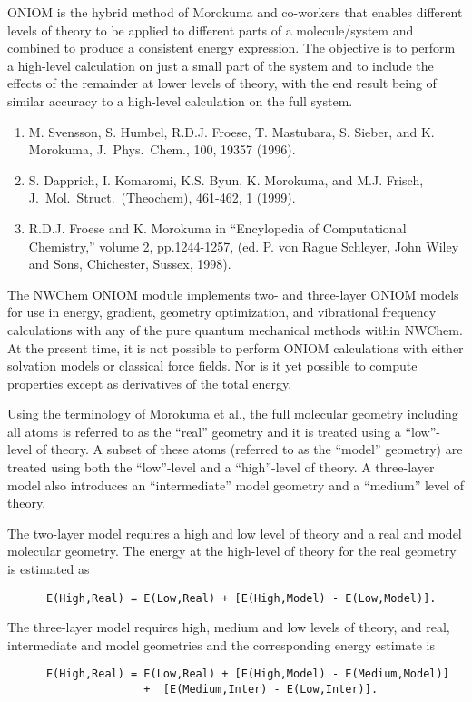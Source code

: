 %
%
\label{sec:oniom}

ONIOM is the hybrid method of Morokuma and co-workers that enables
different levels of theory to be applied to different parts of a
molecule/system and combined to produce a consistent energy
expression.  The objective is to perform a high-level calculation on
just a small part of the system and to include the effects of the
remainder at lower levels of theory, with the end result being of
similar accuracy to a high-level calculation on the full system.

\begin{enumerate}
\item M. Svensson, S. Humbel, R.D.J. Froese, T. Mastubara, S. Sieber, and
K. Morokuma, J.~Phys.~Chem., 100, 19357 (1996).
\item  S. Dapprich, I. Komaromi, K.S. Byun, K. Morokuma, and M.J. Frisch,
J.~Mol.~Struct.~(Theochem), 461-462, 1 (1999).
\item R.D.J. Froese and K. Morokuma in ``Encylopedia of Computational Chemistry,'' 
volume 2, pp.1244-1257, (ed. P. von Rague Schleyer, John Wiley and Sons, 
Chichester, Sussex, 1998).
\end{enumerate}

The NWChem ONIOM module implements two- and three-layer ONIOM models
for use in energy, gradient, geometry optimization, and vibrational
frequency calculations with any of the pure quantum mechanical methods
within NWChem.  At the present time, it is not possible to perform
ONIOM calculations with either solvation models or classical force
fields.  Nor is it yet possible to compute properties except as
derivatives of the total energy.  

Using the terminology of Morokuma et al., the full molecular geometry
including all atoms is referred to as the ``real'' geometry and it is
treated using a ``low''-level of theory.  A subset of these atoms
(referred to as the ``model'' geometry) are treated using both the
``low''-level and a ``high''-level of theory.  A three-layer model
also introduces an ``intermediate'' model geometry and a ``medium''
level of theory.

The two-layer model requires a high and low level of theory and a
real and model molecular geometry.  The energy at the high-level of
theory for the real geometry is estimated as
\begin{verbatim}
      E(High,Real) = E(Low,Real) + [E(High,Model) - E(Low,Model)].
\end{verbatim}
The three-layer model requires high, medium and low levels of theory,
and real, intermediate and model geometries and the corresponding
energy estimate is
\begin{verbatim}
      E(High,Real) = E(Low,Real) + [E(High,Model) - E(Medium,Model)]
                     +  [E(Medium,Inter) - E(Low,Inter)].
\end{verbatim}

